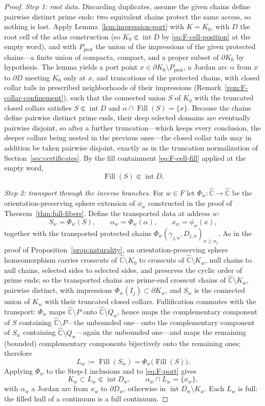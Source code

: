\documentclass[11pt,reqno]{amsart}
\theoremstyle{definition}
\theoremstyle{remark}
\newcommand{\Chat}{\widehat{\mathbb C}}
\newcommand{\Fill}{\operatorname{Fill}}
\newcommand{\Int}{\operatorname{int}}
\begin{document}
\begin{proof}
\emph{Step 1: root data.}
Discarding duplicates, assume the given chains define pairwise distinct
prime ends: two equivalent chains protect the same access, so nothing is
lost.  Apply Lemma~\ref{lem:impression-port} with $K=K_0$, with $D$ the root
cell of the atlas construction (so $K_0\Subset\Int D$ by
\eqref{eq:F-cell-position} at the empty word), and with
$P_{\mathrm{prot}}$ the union of the impressions of the given protected
chains---a finite union of compacta, compact, and a proper subset of
$\partial K_0$ by hypothesis.  The lemma yields a port point
$x\in\partial K_0\setminus P_{\mathrm{prot}}$, a Jordan arc $\alpha$ from
$x$ to $\partial D$ meeting $K_0$ only at $x$, and truncations of the
protected chains, with closed collar tails in prescribed neighborhoods of
their impressions (Remark~\ref{rem:F-collar-confinement}), such that the
connected union $S$ of $K_0$ with the
truncated closed collars satisfies $S\Subset\Int D$ and
$\alpha\cap\Fill(S)=\{x\}$.  Because the chains define pairwise distinct
prime ends, their deep selected domains are eventually pairwise
disjoint, so after a further truncation---which keeps every conclusion,
the deeper collars being nested in the previous ones---the closed collar
tails may in addition be taken pairwise disjoint, exactly as in the
truncation normalization of Section~\ref{sec:certificates}.  By the fill
containment \eqref{eq:F-cell-fill} applied at the empty word,
\[
\Fill(S)\Subset\Int D .
\]

\emph{Step 2: transport through the inverse branches.}
For $w\in F$ let $\Phi_w\colon\Chat\to\Chat$ be the orientation-preserving
sphere extension of $\phi_w$ constructed in the proof of
Theorem~\ref{thm:full-fibers}.  Define the transported data at address
$w$:
\[
S_w=\Phi_w(S),\qquad
\alpha_w=\Phi_w(\alpha),\qquad
x_w=\phi_w(x),
\]
together with the transported protected chains
$\Phi_w(\gamma_{j,n},D_{j,n})_{n\ge n_j}$.  As in the proof of
Proposition~\ref{prop:naturality}, an orientation-preserving sphere
homeomorphism carries crosscuts of $\Chat\setminus K_0$ to crosscuts of
$\Chat\setminus K_w$, null chains to null chains, selected sides to
selected sides, and preserves the cyclic order of prime ends; so the
transported chains are prime-end crosscut chains of
$\Chat\setminus K_w$, pairwise distinct, with impressions
$\Phi_w(I_j)\subset\partial K_w$, and $S_w$ is the connected union of
$K_w$ with their truncated closed collars.  Fullification commutes with
the transport: $\Phi_w$ maps $\Chat\setminus P$ onto
$\Chat\setminus Q_w$, hence maps the complementary component of $S$
containing $\Chat\setminus P$---the unbounded one---onto the
complementary component of $S_w$ containing $\Chat\setminus Q_w$---again
the unbounded one---and maps the remaining (bounded) complementary
components bijectively onto the remaining ones; therefore
\[
L_w:=\Fill(S_w)=\Phi_w\bigl(\Fill(S)\bigr).
\]
Applying $\Phi_w$ to the Step-1 inclusions and to \eqref{eq:F-port}
gives
\[
K_w\subset L_w\Subset\Int D_w,
\qquad
\alpha_w\cap L_w=\{x_w\},
\]
with $\alpha_w$ a Jordan arc from $x_w$ to $\partial D_w$, otherwise in
$\Int D_w\setminus K_w$.  Each $L_w$ is full: the filled hull of a
continuum is a full continuum.


\end{proof}
\end{document}
